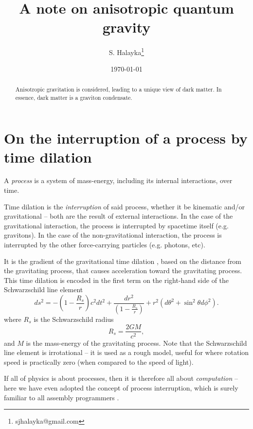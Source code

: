 \documentclass[12pt]{article}
\title{A note on anisotropic quantum gravity}
\author{S. Halayka\footnote{sjhalayka@gmail.com}}
\date{\today\;\currenttime}
\begin{document}
 
\maketitle

\begin{abstract}
Anisotropic gravitation is considered, leading to a unique view of dark matter.
In essence, dark matter is a graviton condensate.
\end{abstract}






\section{On the interruption of a process by time dilation}

A {\textit{process}} is a system of mass-energy, including its internal interactions, over time.

Time dilation is the {\textit{interruption}} of said process, whether it be kinematic and/or gravitational -- both are the result of external interactions.
In the case of the gravitational interaction, the process is interrupted by spacetime itself (e.g. gravitons).
In the case of the non-gravitational interaction, the process is interrupted by the other force-carrying particles (e.g. photons, etc).

It is the gradient of the gravitational time dilation \cite{misner}, based on the distance from the gravitating process, that causes acceleration toward the gravitating process.
This time dilation is encoded in the first term on the right-hand side of the Schwarzschild line element
\begin{equation}
ds^2 = -\left( 1 - \frac{R_s}{r} \right) c^2 dt^2 + \frac{dr^2}{\left( 1 - \frac{R_s}{r} \right)} + r^2 (d\theta^2 + \sin^2 \theta d\phi^2).
\end{equation}
where $R_s$ is the Schwarzschild radius
\begin{equation}
R_s = \frac{2GM}{c^2},
\end{equation}
and $M$ is the mass-energy of the gravitating process.
Note that the Schwarzschild line element is irrotational -- it is used as a rough model, useful for where rotation speed is practically zero (when compared to the speed of light).

If all of physics is about processes, then it is therefore all about {\textit{computation}} \cite{zuse, wolfram} -- here we have even adopted the concept of process interruption, which is surely familiar to all assembly programmers \cite{abrash}.
\end{document}

